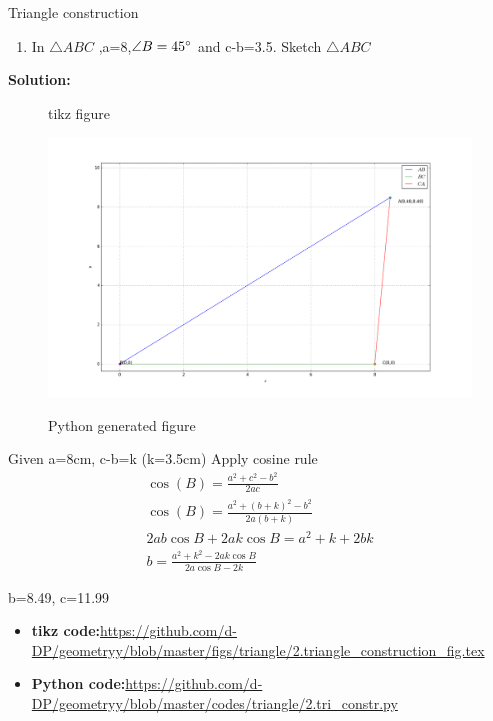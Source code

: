 \begin{frame}{Triangle construction}
\begin{enumerate}
\conti
\item In $\triangle{ABC}$ ,a=8,$\angle{B}=45\degree$ and c-b=3.5. Sketch $\triangle{ABC}$
\seti
\end{enumerate}
\textbf{Solution:}
\begin{figure}[!ht]
\resizebox{0.5\linewidth}{!}
{

}
\caption{tikz figure}
\label{fig:foo}
\end{figure}
\end{frame}
\begin{frame}
\begin{figure}[!ht]
\resizebox{1\linewidth}{!}
{
\includegraphics[scale=0.4]{./figs/triangle/constr.png}
}
\caption{Python generated figure}
\label{fig:foo}
\end{figure}
\end{frame}
\begin{frame}
Given a=8cm, c-b=k (k=3.5cm)
Apply cosine rule 
\begin{align*}
	\cos{(B)} = \frac{a^2+c^2-b^2}{2ac}\\
	\cos{(B)}= \frac{a^2+(b+k)^2-b^2}{2a(b+k)}\\
	2ab\cos{B}+2ak\cos{B}=a^2+k+2bk\\
	b=\frac{a^2 + k^2-2ak \cos{B} }{2a\cos{B}-2k}
\end{align*}
\begin{center}
b=8.49, c=11.99
\end{center}
\begin{itemize}
\item \textbf{tikz code:}\url{https://github.com/d-DP/geometryy/blob/master/figs/triangle/2.triangle_construction_fig.tex}\\
\item \textbf{Python code:}\url{https://github.com/d-DP/geometryy/blob/master/codes/triangle/2.tri_constr.py}\\
\end{itemize}
\end{frame}
